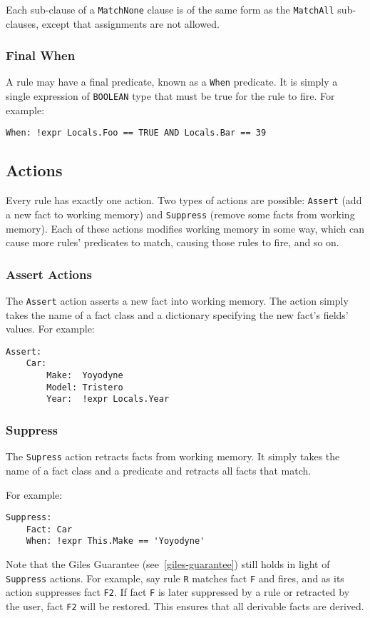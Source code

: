 \documentclass[letterpaper,10pt]{article}
\begin{document}
Each sub-clause of a \texttt{MatchNone} clause is of the same form as the \texttt{MatchAll} sub-clauses, except that assignments are not allowed.

\subsubsection{Final When}
A rule may have a final predicate, known as a \texttt{When} predicate.
It is simply a single expression of \texttt{BOOLEAN} type that must be true for the rule to fire.
For example:
\begin{lstlisting}
When: !expr Locals.Foo == TRUE AND Locals.Bar == 39
\end{lstlisting}

\subsection{Actions}
Every rule has exactly one action.
Two types of actions are possible: \texttt{Assert} (add a new fact to working memory) and \texttt{Suppress} (remove some facts from working memory).
Each of these actions modifies working memory in some way, which can cause more rules' predicates to match, causing those rules to fire, and so on.

\subsubsection{Assert Actions}
The \texttt{Assert} action asserts a new fact into working memory.
The action simply takes the name of a fact class and a dictionary specifying the new fact's fields' values.
For example:
\begin{lstlisting}
Assert:
    Car:
        Make:  Yoyodyne
        Model: Tristero
        Year:  !expr Locals.Year
\end{lstlisting}

\subsubsection{Suppress}
The \texttt{Supress} action retracts facts from working memory.
It simply takes the name of a fact class and a predicate and retracts all facts that match.

For example:
\begin{lstlisting}
Suppress:
    Fact: Car
    When: !expr This.Make == 'Yoyodyne'
\end{lstlisting}

Note that the Giles Guarantee (see~\ref{giles-guarantee}) still holds in light of \texttt{Suppress} actions.
For example, say rule \texttt{R} matches fact \texttt{F} and fires, and as its action suppresses fact \texttt{F2}.
If fact \texttt{F} is later suppressed by a rule or retracted by the user, fact \texttt{F2} will be restored.
This ensures that all derivable facts are derived.
\end{document}
